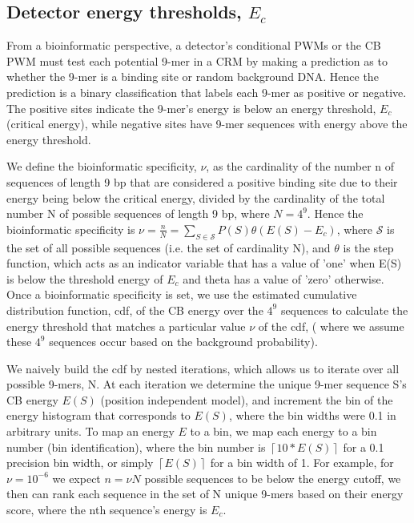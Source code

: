 \subsection{ Detector energy thresholds, $E_c$}
From a bioinformatic perspective, a detector's conditional PWMs or the CB PWM must test each potential 9-mer in a CRM by making a prediction as to whether the 9-mer is a binding site or random background DNA.  Hence the prediction is a binary classification that labels each 9-mer as positive or negative.  The positive sites indicate the 9-mer's energy is below an energy threshold, $E_c$ (critical energy), while negative sites have 9-mer sequences with energy above the energy threshold.

We define the bioinformatic specificity, $\nu$, as the cardinality of the number n of sequences of length 9 bp that are considered a positive binding site due to their energy being below the critical energy, divided by the cardinality of the total number N of possible sequences of length 9 bp, where $N=4^9$.  Hence the bioinformatic specificity is $\nu =\frac{n}{N}= \sum_{S\in \mathcal S} P(S) \theta(E(S)-E_c) $, where $\mathcal S$ is the set of all possible sequences (i.e. the set of cardinality N), and $\theta$ is the step function, which acts as an indicator variable that has a value of 'one' when E(S) is below the threshold energy of $E_c$ and theta has a value of 'zero' otherwise.  Once a bioinformatic specificity is set, we use the estimated cumulative distribution function, cdf, of the CB energy over the $4^9$ sequences to calculate the energy threshold that matches a particular value $\nu$ of the cdf, ( where we assume these $4^9$ sequences occur based on the background probability).

We naively build the cdf by nested iterations, which allows us to iterate over all possible 9-mers, N.  At each iteration we determine the unique 9-mer sequence S's CB energy $E(S)$ (position independent model), and increment the bin of the energy histogram that corresponds to $E(S)$, where the bin widths were 0.1 in arbitrary units.  To map an energy $E$ to a bin, we map each energy to a bin number (bin identification), where the bin number is $\left \lceil{10*E(S)}\right \rceil$ for a 0.1 precision bin width, or simply $\left \lceil{E(S)}\right \rceil$ for a bin width of 1.  For example, for $\nu=10^{-6}$ we expect $n=\nu N$ possible sequences to be below the energy cutoff, we then can rank each sequence in the set of N unique 9-mers based on their energy score, where the nth sequence's energy is $E_c$.


